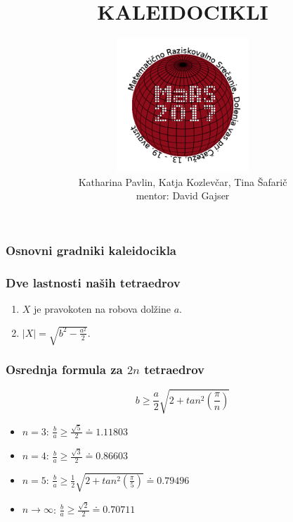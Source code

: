 \documentclass{beamer}
\title{KALEIDOCIKLI}
\author[Katharina, Katja, Tina, David]{\includegraphics[width = 5cm]{logo_MaRS2017.png} \\ Katharina Pavlin, Katja Kozlevčar, Tina Šafarič \\ mentor: David Gajser}
\theoremstyle{plain}
\begin{document}


\begin{frame}
\maketitle

\end{frame}


\begin{frame}
\frametitle{Osnovni gradniki kaleidocikla}
\end{frame}
\begin{frame}
\frametitle{Dve lastnosti naših tetraedrov}
\pause
\begin{enumerate}
\item $X$ je pravokoten na robova dolžine $a$.\pause
\item $|X| = \sqrt{b^2 - \frac{a^2}{2}}.$
\end{enumerate}


\end{frame}




\begin{frame}
\frametitle{Osrednja formula za $2n$ tetraedrov}
\large

$$b\geq \frac{a}{2}\sqrt{2 + tan^2 (\frac{\pi}{n})}$$

\begin{itemize} \pause
\item $n=3$: \hspace {0.5cm} $\frac{b}{a}\geq \frac{\sqrt{5}}{2} \doteq 1.11803$ \pause
\item $n=4$: \hspace {0.5cm} $\frac{b}{a}\geq \frac{\sqrt{3}}{2} \doteq 0.86603$ \pause
\item $n=5$: \hspace {0.5cm} $\frac{b}{a}\geq \frac{1}{2}\sqrt{2 + tan^2 (\frac{\pi}{5})} \doteq 0.79496 $ \pause
\item $n\rightarrow \infty $: \hspace {0.195cm} $\frac{b}{a}\geq \frac{\sqrt{2}}{2} \doteq 0.70711 $ \pause
\end{itemize}

\end{frame}
\end{document}
